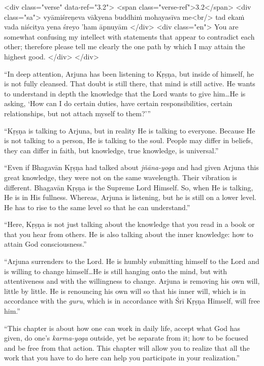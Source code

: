\begin{html}
<div class="verse" data-ref="3.2">
  <span class="verse-ref">3.2</span>
  <div class="sa">
    vyāmiśreṇeva vākyena buddhiṁ mohayasīva me<br/>
    tad ekaṁ vada niścitya yena śreyo ’ham āpnuyām
  </div>
  <div class="en">
    You are somewhat confusing my intellect with statements that appear to contradict each other; therefore please tell me clearly the one path by which I may attain the highest good.
  </div>
</div>
\end{html}



\enquote{In deep attention, Arjuna has been listening to Kṛṣṇa, but inside of himself, he is not fully cleansed. That doubt is still there, that mind is still active. He wants to understand in depth the knowledge that the Lord wants to give him\ldots He is asking, \enquote{How can I do certain duties, have certain responsibilities, certain relationships, but not attach myself to them?}}

\enquote{Kṛṣṇa is talking to Arjuna, but in reality He is talking to everyone. Because He is not talking to a person, He is talking to the soul. People may differ in beliefs, they can differ in faith, but knowledge, true knowledge, is universal.}

\enquote{Even if Bhagavān Kṛṣṇa had talked about \textit{jñāna-yoga} and had given Arjuna this great knowledge, they were not on the same wavelength. Their vibration is different. Bhagavān Kṛṣṇa is the Supreme Lord Himself. So, when He is talking, He is in His fullness. Whereas, Arjuna is listening, but he is still on a lower level. He has to rise to the same level so that he can understand.}

\enquote{Here, Kṛṣṇa is not just talking about the knowledge that you read in a book or that you hear from others. He is also talking about the inner knowledge: how to attain God consciousness.}

\enquote{Arjuna surrenders to the Lord. He is humbly submitting himself to the Lord and is willing to change himself\ldots He is still hanging onto the mind, but with attentiveness and with the willingness to change. Arjuna is removing his own will, little by little. He is renouncing his own will so that his inner will, which is in accordance with the \textit{guru}, which is in accordance with Śrī Kṛṣṇa Himself, will free him.}

\enquote{This chapter is about how one can work in daily life, accept what God has given, do one’s \textit{karma-yoga} outside, yet be separate from it; how to be focused and be free from that action. This chapter will allow you to realize that all the work that you have to do here can help you participate in your realization.}


